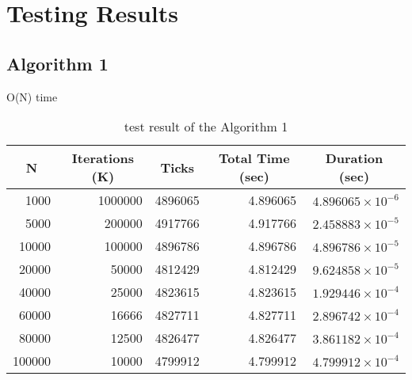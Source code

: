 \chapter{Testing Results}

\section{Algorithm 1}
O(N) time
\begin{table}[H]
	\centering
	\caption{test result of the Algorithm 1}
	\begin{tabular}{|r|r|r|r|r|}
		\hline
		\multicolumn{1}{|c|}{N} &
		\multicolumn{1}{|c|}{Iterations (K)} &
		\multicolumn{1}{|c|}{Ticks} &
		\multicolumn{1}{|c|}{Total Time (sec)} &
		\multicolumn{1}{|c|}{Duration (sec)} \\
		\hline
		1000 & 1000000 & 4896065 & 4.896065 & $4.896065 \times 10 ^ {-6}$ \\
		\hline
		5000 & 200000 & 4917766 & 4.917766 & $2.458883 \times 10 ^ {-5}$ \\
		\hline
		10000 & 100000 & 4896786 & 4.896786 & $4.896786 \times 10 ^ {-5}$ \\
		\hline
		20000 & 50000 & 4812429 & 4.812429 & $9.624858 \times 10 ^ {-5}$ \\
		\hline
		40000 & 25000 & 4823615 & 4.823615 & $1.929446 \times 10 ^ {-4}$ \\
		\hline
		60000 & 16666 & 4827711 & 4.827711 & $2.896742 \times 10 ^ {-4}$ \\
		\hline
		80000 & 12500 & 4826477 & 4.826477 & $3.861182 \times 10 ^ {-4}$ \\
		\hline
		100000 & 10000 & 4799912 & 4.799912 & $4.799912 \times 10 ^ {-4}$ \\
		\hline
	\end{tabular}
\end{table}


